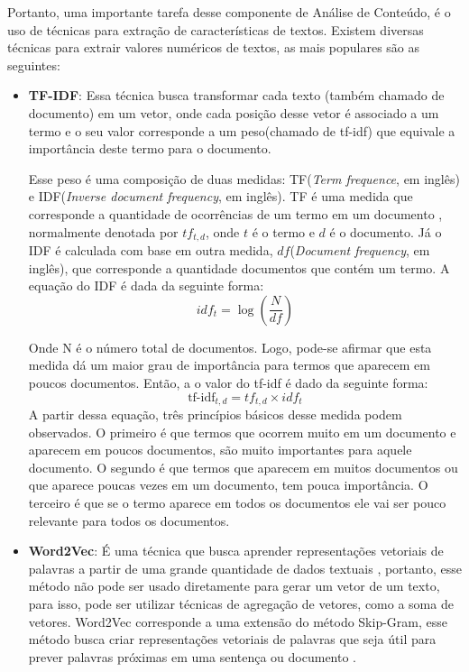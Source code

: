 Portanto, uma importante tarefa desse componente de Análise de Conteúdo, é o uso de técnicas para extração de características de textos. Existem diversas técnicas para extrair valores numéricos de textos, as mais populares são as seguintes:
\begin{itemize}
    \item \textbf{TF-IDF}: Essa técnica busca transformar cada texto (também chamado de documento) em um vetor, onde cada posição desse vetor é associado a um termo e o seu valor corresponde a um peso(chamado de tf-idf) que equivale a importância deste termo para o documento\cite{schutze2008introduction}.
    
    Esse peso é uma composição de duas medidas: TF(\textit{Term frequence}, em inglês) e IDF(\textit{Inverse document frequency}, em inglês). TF é uma medida que corresponde a quantidade de ocorrências de um termo em um documento \cite{schutze2008introduction}, normalmente denotada por \(tf_{t,d}\), onde \(t\) é o termo e \(d\) é o documento. Já o IDF é calculada com base em outra medida,  \(df\)(\textit{Document frequency}, em inglês), que corresponde a quantidade documentos que contém um termo. A equação do IDF é dada da seguinte forma:
    \begin{equation}
        idf_t = \log(\frac{N}{df})
    \end{equation}
    
    Onde N é o número total de documentos. Logo, pode-se afirmar que esta medida dá um maior grau de importância para termos que aparecem em poucos documentos. Então, a o valor do tf-idf é dado da seguinte forma:
    \begin{equation}
        \mbox{tf-idf}_{t, d} = tf_{t,d} \times idf_t 
    \end{equation}
    A partir dessa equação, três princípios básicos desse medida podem observados. O primeiro é que termos que ocorrem muito em um documento e aparecem em poucos documentos, são muito importantes para aquele documento. O segundo é que termos que aparecem em muitos documentos ou que aparece poucas vezes em um documento, tem pouca importância. O terceiro é que se o termo aparece em todos os documentos ele vai ser pouco relevante para todos os documentos.
    
    \item \textbf{Word2Vec}: É uma técnica que busca aprender representações vetoriais de palavras a partir de uma grande quantidade de dados textuais \cite{mikolov2013distributed}, portanto, esse método não pode ser usado diretamente para gerar um vetor de um texto, para isso, pode ser utilizar técnicas de agregação de vetores, como a soma de vetores. Word2Vec corresponde a uma extensão do método Skip-Gram, esse método busca criar representações vetoriais de palavras que seja útil para prever palavras próximas em uma sentença ou documento \cite{mikolov2013efficient}.
    

\end{itemize}
